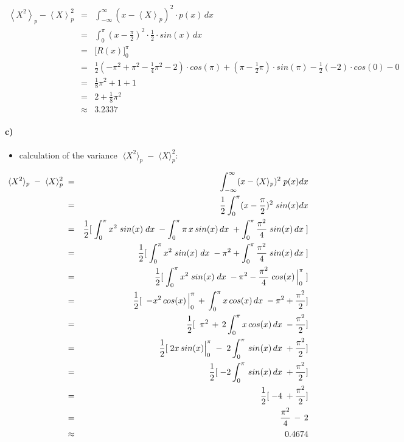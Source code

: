 \documentclass[11pt,a4paper]{article}
\begin{document}
\begin{enumerate}[a)]
\begin{eqnarray*}
\left\langle X^2 \right\rangle_p - \left\langle X \right\rangle_p^2
&   = & \int_{-\infty}^\infty \left( x - \left\langle X \right\rangle_p \right)^2 \cdot p(x) \, dx\\
&   = & \int_0^\pi \left( x - \frac{\pi}{2} \right)^2 \cdot \frac{1}{2} \cdot sin(x) \, dx\\
&   = & \Big[ R(x) \Big]_0^\pi\\
&   = & \frac{1}{2} \left( -\pi^2 + \pi^2 - \frac{1}{4} \pi^2 - 2 \right) \cdot cos(\pi)
        + \left( \pi - \frac{1}{2} \pi \right) \cdot sin(\pi)
        - \frac{1}{2} (-2) \cdot cos(0) - 0\\
&   = & \frac{1}{8} \pi^2 + 1 + 1\\
&   = & 2 + \frac{1}{8} \pi^2\\
& \approx & 3.2337
\end{eqnarray*}

\end{enumerate}

\paragraph{c)}
\begin{itemize}
\item calculation of the variance $\;\langle X^2\rangle_p\;-\;\langle X\rangle_p^2$:
\end{itemize}

\begin{eqnarray}
\langle X^2\rangle_p\;-\;\langle X\rangle_p^2\;&=&\;\int_{-\infty}^{\infty} (x-\langle X \rangle_p)^2 \;p(x)dx \\
&=& \frac{1}{2}\int_{0}^{\pi} (x- \frac{\pi}{2})^2\;sin(x)dx \\
&=& \frac{1}{2} [\;\int_{0}^{\pi}x^2\;sin(x)\;dx\; - \int_{0}^{\pi}\pi\,x\,sin(x)\,dx\; + \int_{0}^{\pi}\frac{\pi^2}{4}\;sin(x)\,dx\;] \\
&=& \frac{1}{2} [\;\int_{0}^{\pi}x^2\;sin(x)\;dx\; - \pi^2 + \int_{0}^{\pi}\frac{\pi^2}{4}\;sin(x)\,dx\;] \\
&=& \frac{1}{2} [\;\int_{0}^{\pi}x^2\;sin(x)\;dx\; - \pi^2 - \frac{\pi^2}{4}\;cos(x)\,\Big{\vert}_0^\pi\;] \\
&=& \frac{1}{2} [\;\; -x^2\,cos(x)\,\Big{\vert}_0^\pi\,+\,\int_0^\pi x\,cos(x)\,dx \; - \pi^2 + \frac{\pi^2}{2}] \\
&=& \frac{1}{2} [\;\; \pi^2\,+\,2\int_0^\pi x\,cos(x)\,dx \; - \frac{\pi^2}{2}] \\
&=& \frac{1}{2} [\;2x\,sin(x)\Big{\vert}_0^\pi\;-\;2\int_0^\pi\,sin(x)\,dx \; + \frac{\pi^2}{2}] \\
&=& \frac{1}{2} [\;-2\int_0^\pi\,sin(x)\,dx \; + \frac{\pi^2}{2}] \\
&=& \frac{1}{2} [\;-4\;+ \frac{\pi^2}{2}] \\
&=& \frac{\pi^2}{4}\,-\,2\\
&\approx&\;0.4674
\end{eqnarray}
\end{document}
